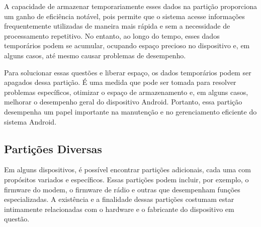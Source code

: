 A capacidade de armazenar temporariamente esses dados na partição proporciona um ganho de eficiência notável, pois permite que o sistema acesse informações frequentemente utilizadas de maneira mais rápida e sem a necessidade de processamento repetitivo. No entanto, ao longo do tempo, esses dados temporários podem se acumular, ocupando espaço precioso no dispositivo e, em alguns casos, até mesmo causar problemas de desempenho.

Para solucionar essas questões e liberar espaço, os dados temporários podem ser apagados dessa partição. É uma medida que pode ser tomada para resolver problemas específicos, otimizar o espaço de armazenamento e, em alguns casos, melhorar o desempenho geral do dispositivo Android. Portanto, essa partição desempenha um papel importante na manutenção e no gerenciamento eficiente do sistema Android.

\subsection{Partições Diversas}

Em alguns dispositivos, é possível encontrar partições adicionais, cada uma com propósitos variados e específicos. Essas partições podem incluir, por exemplo, o firmware do modem, o firmware de rádio e outras que desempenham funções especializadas. A existência e a finalidade dessas partições costumam estar intimamente relacionadas com o hardware e o fabricante do dispositivo em questão.





